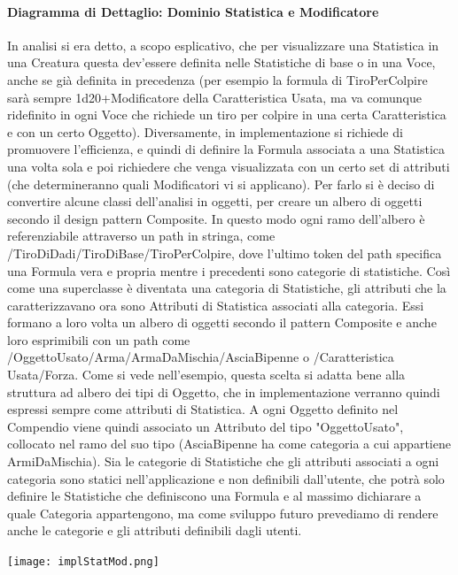 \documentclass[a4paper, 11pt]{article}
\begin{document}
\paragraph{Diagramma di Dettaglio: Dominio Statistica e Modificatore\\}
In analisi si era detto, a scopo esplicativo, che per visualizzare una Statistica in una Creatura questa dev'essere definita nelle Statistiche di base o in una Voce, anche se già definita in precedenza (per esempio la formula di TiroPerColpire sarà sempre 1d20+Modificatore della Caratteristica Usata, ma va comunque ridefinito in ogni Voce che richiede un tiro per colpire in una certa Caratteristica e con un certo Oggetto). Diversamente, in implementazione si richiede di promuovere l'efficienza, e quindi di definire la Formula associata a una Statistica una volta sola e poi richiedere che venga visualizzata con un certo set di attributi (che determineranno quali Modificatori vi si applicano). Per farlo si è deciso di convertire alcune classi dell'analisi in oggetti, per creare un albero di oggetti secondo il design pattern Composite. In questo modo ogni ramo dell'albero è referenziabile attraverso un path in stringa, come /TiroDiDadi/TiroDiBase/TiroPerColpire, dove l'ultimo token del path specifica una Formula vera e propria mentre i precedenti sono categorie di statistiche. Così come una superclasse è diventata una categoria di Statistiche, gli attributi che la caratterizzavano ora sono Attributi di Statistica associati alla categoria. Essi formano a loro volta un albero di oggetti secondo il pattern Composite e anche loro esprimibili con un path come /OggettoUsato/Arma/ArmaDaMischia/AsciaBipenne o /Caratteristica Usata/Forza. Come si vede nell'esempio, questa scelta si adatta bene alla struttura ad albero dei tipi di Oggetto, che in implementazione verranno quindi espressi sempre come attributi di Statistica. A ogni Oggetto definito nel Compendio viene quindi associato un Attributo del tipo "OggettoUsato", collocato nel ramo del suo tipo (AsciaBipenne ha come categoria a cui appartiene ArmiDaMischia). Sia le categorie di Statistiche che gli attributi associati a ogni categoria sono statici nell'applicazione e non definibili dall'utente, che potrà solo definire le Statistiche che definiscono una Formula e al massimo dichiarare a quale Categoria appartengono, ma come sviluppo futuro prevediamo di rendere anche le categorie e gli attributi definibili dagli utenti.
\vspace{1em}
    \begin{center}
        \centering
        \texttt{[image: implStatMod.png]}
        \label{fig:implStatMod}
    \end{center}
\end{document}
